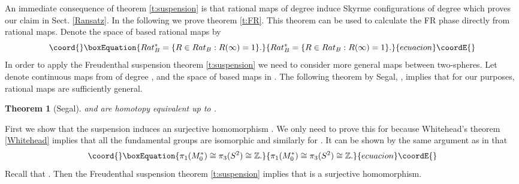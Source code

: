 \documentclass[a4paper,12pt]{article}
\newtheorem {theorem}{Theorem}[section]
\begin{document}
An immediate consequence of theorem \ref{t:suspension} is that rational
maps of degree \coordHE{} induce Skyrme configurations of degree \coordHE{} which proves our 
claim in Sect. \ref{Ransatz}. In the
following we prove theorem \ref{t:FR}. This theorem can be used to
calculate the FR phase directly from rational maps.
Denote the space of based rational maps \coordHE{} by
%
\begin{equation}\coord{}\boxEquation{
Rat_B^* = \{R \in Rat_B: R(\infty) = 1 \}.
}{
Rat_B^* = \{R \in Rat_B: R(\infty) = 1 \}.
}{ecuacion}\coordE{}\end{equation}
%
In order to apply the Freudenthal suspension theorem \ref{t:suspension} we 
need to consider more general maps between two-spheres.
%
Let \coordHE{} denote continuous maps from \coordHE{} of degree 
\coordHE{}, and  \coordHE{} the space of based maps in \coordHE{}. The following 
theorem by Segal, \cite{Segal:1979}, implies that for our purposes, rational 
maps are sufficiently general.
%
\begin{theorem}[Segal] 
\label{t:homotopyequiv}
\coordHE{} and \coordHE{} are homotopy equivalent up to \coordHE{}. \hfill \myHighlight{$\square$}\coordHE{}
\end{theorem}


First we show that the suspension \coordHE{} induces an surjective homomorphism 
\coordHE{}.
We only need to prove this  
for \coordHE{} because Whitehead's theorem \ref{Whitehead} implies that all the 
fundamental groups \coordHE{} are isomorphic and similarly for 
\coordHE{}. It can be shown by the same argument as in 
\cite{Finkelstein:1966ft} that 
%
\begin{equation}\coord{}\boxEquation{
\pi_1(M_0^*) \cong \pi_3(S^2) \cong {\mathbb Z}.
}{
\pi_1(M_0^*) \cong \pi_3(S^2) \cong {\mathbb Z}.
}{ecuacion}\coordE{}\end{equation}
%
Recall that \coordHE{}. Then the Freudenthal
suspension theorem \ref{t:suspension} implies that \coordHE{} is a
surjective homomorphism. 
\end{document}
